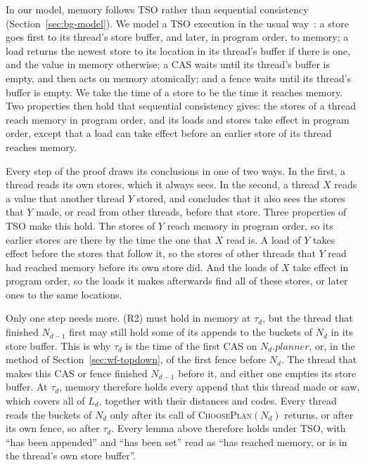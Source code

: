 In our model, memory follows TSO rather than sequential consistency (Section~\ref{sec:bg-model}). We model a TSO execution in the usual way~\cite{x86tso}: a store goes first to its thread's store buffer, and later, in program order, to memory; a load returns the newest store to its location in its thread's buffer if there is one, and the value in memory otherwise; a CAS waits until its thread's buffer is empty, and then acts on memory atomically; and a fence waits until its thread's buffer is empty. We take the time of a store to be the time it reaches memory. Two properties then hold that sequential consistency gives: the stores of a thread reach memory in program order, and its loads and stores take effect in program order, except that a load can take effect before an earlier store of its thread reaches memory.

Every step of the proof draws its conclusions in one of two ways. In the first, a thread reads its own stores, which it always sees. In the second, a thread $X$ reads a value that another thread $Y$ stored, and concludes that it also sees the stores that $Y$ made, or read from other threads, before that store. Three properties of TSO make this hold. The stores of $Y$ reach memory in program order, so its earlier stores are there by the time the one that $X$ read is. A load of $Y$ takes effect before the stores that follow it, so the stores of other threads that $Y$ read had reached memory before its own store did. And the loads of $X$ take effect in program order, so the loads it makes afterwards find all of these stores, or later ones to the same locations.

Only one step needs more. (R2) must hold in memory at $\tau_d$, but the thread that finished $N_{d-1}$ first may still hold some of its appends to the buckets of $N_d$ in its store buffer. This is why $\tau_d$ is the time of the first CAS on $N_d.\mathit{planner}$, or, in the method of Section~\ref{sec:wf-topdown}, of the first fence before $N_d$. The thread that makes this CAS or fence finished $N_{d-1}$ before it, and either one empties its store buffer. At $\tau_d$, memory therefore holds every append that this thread made or saw, which covers all of $L_d$, together with their distances and codes. Every thread reads the buckets of $N_d$ only after its call of \textsc{ChoosePlan}$(N_d)$ returns, or after its own fence, so after $\tau_d$. Every lemma above therefore holds under TSO, with ``has been appended'' and ``has been set'' read as ``has reached memory, or is in the thread's own store buffer''.
